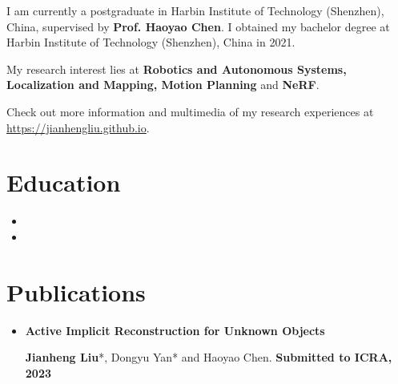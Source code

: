 \documentclass[11pt,a4paper,sans]{moderncv}        %
\begin{document}

\makecvtitle

\small{I am currently a postgraduate in Harbin Institute of Technology (Shenzhen), China, supervised by \textbf{Prof. Haoyao Chen}. I obtained my bachelor degree at Harbin Institute of Technology (Shenzhen), China in 2021.

My research interest lies at \textbf{Robotics and Autonomous Systems, Localization and Mapping, Motion Planning} and \textbf{NeRF}. 

Check out more information and multimedia of my research experiences at \href{https://jianhengliu.github.io}{https://jianhengliu.github.io}.

\section{Education}

\vspace{5pt}

\begin{itemize}

\item{}

\item{}

\end{itemize}

\vspace{2pt}

\section{Publications}

\vspace{5pt}

\begin{itemize}

    \item{\textbf{Active Implicit Reconstruction for Unknown Objects}

    \small{\textbf{Jianheng Liu}*, Dongyu Yan* and Haoyao Chen. \textbf{Submitted to ICRA, 2023}}
    }
    

\end{itemize}}
\end{document}
